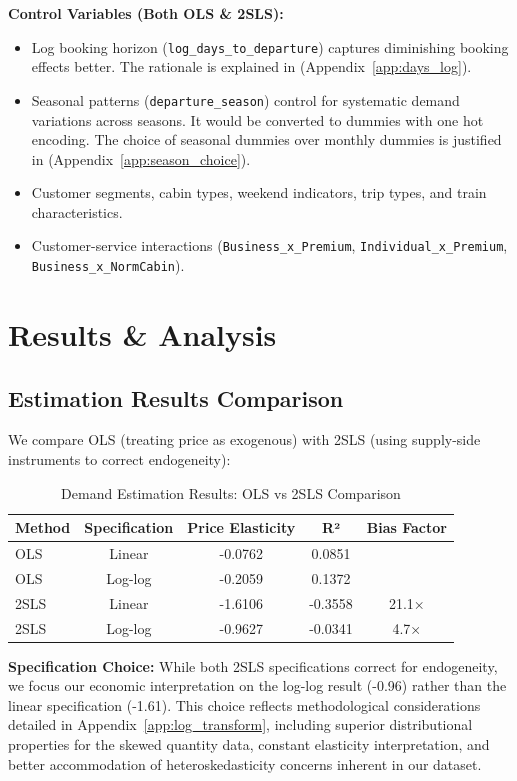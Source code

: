 \documentclass[12pt]{article}
\begin{document}
\textbf{Control Variables (Both OLS \& 2SLS):}
\begin{itemize}
    \item Log booking horizon (\texttt{log\_days\_to\_departure}) captures diminishing booking effects better. The rationale is explained in (Appendix~\ref{app:days_log}).
    \item Seasonal patterns (\texttt{departure\_season}) control for systematic demand variations across seasons. It would be converted to dummies with one hot encoding. The choice of seasonal dummies over monthly dummies is justified in (Appendix~\ref{app:season_choice}).
    \item Customer segments, cabin types, weekend indicators, trip types, and train characteristics.
    \item Customer-service interactions (\texttt{Business\_x\_Premium}, \texttt{Individual\_x\_Premium}, \\
    \texttt{Business\_x\_NormCabin}).
\end{itemize}

\section{Results \& Analysis}

\subsection{Estimation Results Comparison}
We compare OLS (treating price as exogenous) with 2SLS (using supply-side instruments to correct endogeneity):

\begin{table}[H]
\centering
\caption{Demand Estimation Results: OLS vs 2SLS Comparison}
\begin{tabular}{lcccc}
\toprule
Method & Specification & Price Elasticity & R² & Bias Factor \\
\midrule
OLS & Linear & -0.0762 & 0.0851 & \- \\
OLS & Log-log & -0.2059 & 0.1372 & \- \\
2SLS & Linear & -1.6106 & -0.3558 & 21.1× \\
2SLS & Log-log & -0.9627 & -0.0341 & 4.7× \\
\bottomrule
\end{tabular}
\end{table}

\textbf{Specification Choice:} While both 2SLS specifications correct for endogeneity, we focus our economic interpretation on the log-log result (-0.96) rather than the linear specification (-1.61). This choice reflects methodological considerations detailed in Appendix~\ref{app:log_transform}, including superior distributional properties for the skewed quantity data, constant elasticity interpretation, and better accommodation of heteroskedasticity concerns inherent in our dataset.
\end{document}
